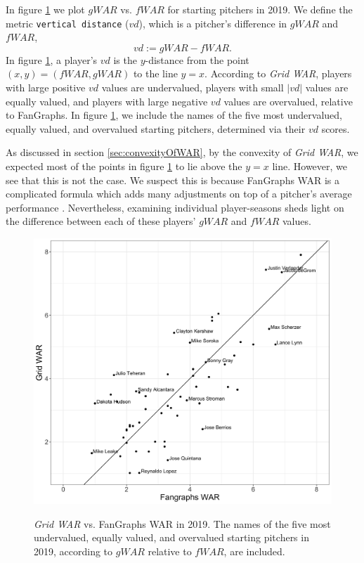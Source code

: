 \documentclass[12pt]{article}
\begin{document}
In figure \ref{fig:gwarVfwar19} we plot $gWAR$ vs. $fWAR$ for starting pitchers in 2019. We define the metric \texttt{vertical distance} ($vd$), which is a pitcher's difference in $gWAR$ and $fWAR$,
\begin{equation}
vd := gWAR - fWAR.
\label{eqn:vd}
\end{equation}
In figure \ref{fig:gwarVfwar19}, a player's $vd$ is the $y$-distance from the point $(x,y)=(fWAR,gWAR)$ to the line $y=x$. According to \textit{Grid WAR}, players with large positive $vd$ values are undervalued, players with small $|vd|$ values are equally valued, and players with large negative $vd$ values are overvalued, relative to FanGraphs. In figure \ref{fig:gwarVfwar19}, we include the names of the five most undervalued, equally valued, and overvalued starting pitchers, determined via their $vd$ scores. 

As discussed in section \ref{sec:convexityOfWAR}, by the convexity of \textit{Grid WAR}, we expected most of the points in figure \ref{fig:gwarVfwar19} to lie above the $y=x$ line. However, we see that this is not the case. We suspect this is because FanGraphs WAR is a complicated formula which adds many adjustments on top of a pitcher's average performance \citep{war_FG}. Nevertheless, examining individual player-seasons sheds light on the difference between each of these players' $gWAR$ and $fWAR$ values. 

\begin{figure}[t!]
\centering
\caption{\textit{Grid WAR} vs. FanGraphs WAR in 2019. The names of the five most undervalued, equally valued, and overvalued starting pitchers in 2019, according to $gWAR$ relative to $fWAR$, are included.} 
\includegraphics[width=15cm]{../writeup_plots/plot_gwar_vs_fwar_2019.png}
\label{fig:gwarVfwar19}
\end{figure}
\end{document}
